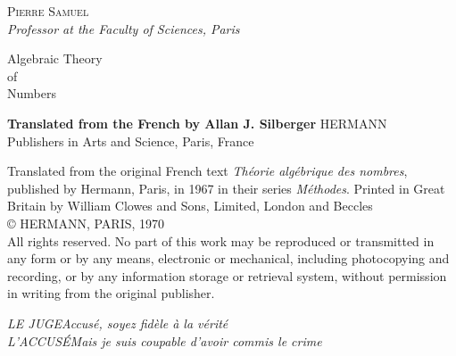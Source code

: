 
\thispagestyle{empty}%
\begin{center}
\vspace*{14mm}
{\scshape Pierre Samuel}\\[2pt]
{\itshape\small Professor at the Faculty of Sciences, Paris}
\vspace{44mm}

{\fontsize{24}{29}\selectfont Algebraic Theory}\\[3mm]
{\fontsize{24}{29}\selectfont of}\\[3mm]
{\fontsize{24}{29}\selectfont Numbers}
\vspace{34mm}

{\bfseries\small Translated from the French by Allan J. Silberger}
\vfill
{\small HERMANN}\\[2pt]
{\small Publishers in Arts and Science, Paris, France}
\end{center}
\clearpage

\thispagestyle{empty}%
\begingroup\small
\noindent
Translated from the original French text \emph{Théorie algébrique des
nombres}, published by Hermann, Paris, in 1967 in their series
\emph{Méthodes}.
\vfill
\noindent
Printed in Great Britain by William Clowes and Sons, Limited, London and
Beccles\\[4pt]
\copyright{} HERMANN, PARIS, 1970\\[4pt]
All rights reserved. No part of this work may be reproduced or transmitted
in any form or by any means, electronic or mechanical, including
photocopying and recording, or by any information storage or retrieval
system, without permission in writing from the original publisher.
\endgroup
\clearpage

\setcounter{page}{5}%
\renewcommand{\chaptertitle}{CONTENTS}%
\tableofcontents

\clearpage
\setcounter{page}{7}%
\begin{flushright}\small\itshape
LE JUGE\quad Accusé, soyez fidèle à la vérité\\
L'ACCUSÉ\quad Mais je suis coupable d'avoir commis le crime
\end{flushright}
\vspace{1.5\baselineskip}


